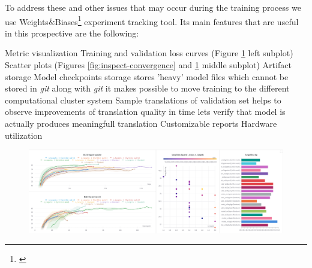 To address these and other issues that may occur during the training process we use
Weights$\&$Biases\footnote{\cite{wandb}} experiment tracking tool.
Its main features that are useful in this prospective are the following:
\begin{outline}
	\1 Metric visualization
		\2 Training and validation loss curves
		(Figure \ref{fig:single-lang-group-vs-random-dashboard} left subplot)
		\2 Scatter plots (Figures \ref{fig:inspect-convergence}
		and \ref{fig:single-lang-group-vs-random-dashboard} middle subplot)
	\1 Artifact storage
		\2 Model checkpoints storage
			\3 stores 'heavy' model files which cannot be stored
			in \emph{git}
			\3 along with \emph{git} it makes possible to move training
			to the different computational cluster system
		\2 Sample translations of validation set
			\3 helps to observe improvements of translation quality
			in time
			\3 lets verify that model is actually produces meaningfull
			translation
	\1 Customizable reports
	\1 Hardware utilization
\end{outline}

\begin{figure}
	\centering
	\includegraphics[width=1.0\columnwidth]{img/slavic_cyrillic_bg.png}
	\label{fig:single-lang-group-vs-random-dashboard}
\end{figure}


